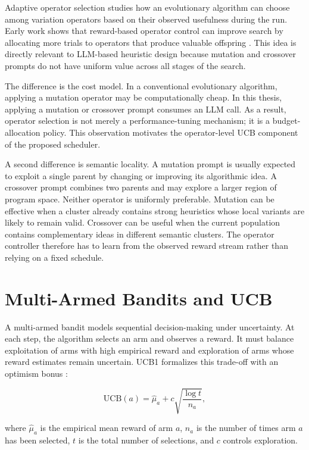 Adaptive operator selection studies how an evolutionary algorithm can choose among variation operators based on their observed usefulness during the run. Early work shows that reward-based operator control can improve search by allocating more trials to operators that produce valuable offspring \cite{fialho2008adaptive}. This idea is directly relevant to LLM-based heuristic design because mutation and crossover prompts do not have uniform value across all stages of the search.

The difference is the cost model. In a conventional evolutionary algorithm, applying a mutation operator may be computationally cheap. In this thesis, applying a mutation or crossover prompt consumes an LLM call. As a result, operator selection is not merely a performance-tuning mechanism; it is a budget-allocation policy. This observation motivates the operator-level UCB component of the proposed scheduler.

A second difference is semantic locality. A mutation prompt is usually expected to exploit a single parent by changing or improving its algorithmic idea. A crossover prompt combines two parents and may explore a larger region of program space. Neither operator is uniformly preferable. Mutation can be effective when a cluster already contains strong heuristics whose local variants are likely to remain valid. Crossover can be useful when the current population contains complementary ideas in different semantic clusters. The operator controller therefore has to learn from the observed reward stream rather than relying on a fixed schedule.

\section{Multi-Armed Bandits and UCB}

A multi-armed bandit models sequential decision-making under uncertainty. At each step, the algorithm selects an arm and observes a reward. It must balance exploitation of arms with high empirical reward and exploration of arms whose reward estimates remain uncertain. UCB1 formalizes this trade-off with an optimism bonus \cite{auer2002ucb,bubeck2012bandits}:

\begin{equation}
  \mathrm{UCB}(a)
  =
  \hat{\mu}_a
  +
  c\sqrt{\frac{\log t}{n_a}},
\end{equation}

where $\hat{\mu}_a$ is the empirical mean reward of arm $a$, $n_a$ is the number of times arm $a$ has been selected, $t$ is the total number of selections, and $c$ controls exploration.

